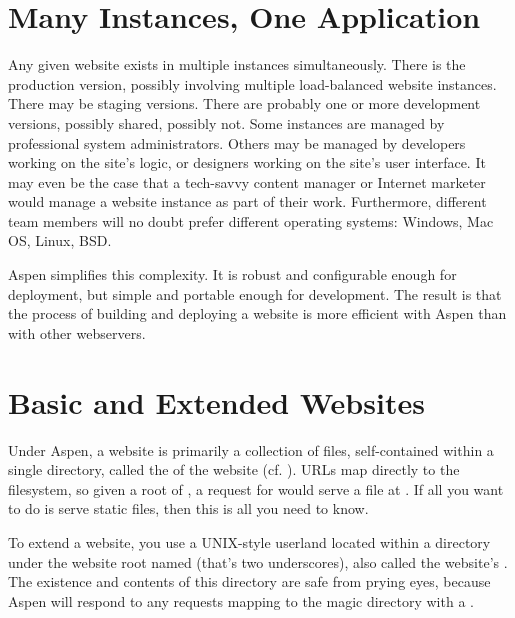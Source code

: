 \section{Many Instances, One Application \label{many-instances-one-application}}

Any given website exists in multiple instances simultaneously. There is the
production version, possibly involving multiple load-balanced website instances.
There may be staging versions. There are probably one or more development
versions, possibly shared, possibly not. Some instances are managed by
professional system administrators. Others may be managed by developers working
on the site's logic, or designers working on the site's user interface. It may
even be the case that a tech-savvy content manager or Internet marketer would
manage a website instance as part of their work. Furthermore, different team
members will no doubt prefer different operating systems: Windows, Mac OS,
Linux, BSD.

Aspen simplifies this complexity. It is robust and configurable enough for
deployment, but simple and portable enough for development. The result is that
the process of building and deploying a website is more efficient with Aspen
than with other webservers.


\section{Basic and Extended Websites \label{basic-and-extended-websites}}

Under Aspen, a website is primarily a collection of files, self-contained within
a single directory, called the  of the website (cf. ). URLs
map directly to the filesystem, so given a root of
, a request for  would serve a
file at . If all you want to do is
serve static files, then this is all you need to know.

To extend a website, you use a UNIX-style userland located within a directory
under the website root named \dfn{__} (that's two underscores), also called the
website's . The existence and contents of this directory
are safe from prying eyes, because Aspen will respond to any requests mapping to
the magic directory with a .
